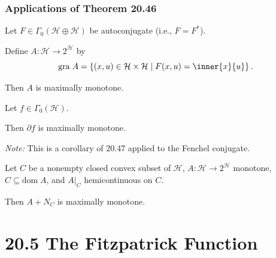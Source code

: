\documentclass[aspectratio=169,10pt]{beamer}
\newcommand{\gra}{\mathrm{gra}\;}
\newcommand{\dom}{\mathrm{dom}\;}
\newcommand{\set}[1]{\left\{#1\right\}}
\newcommand{\Hilbert}{\mathcal{H}}
\begin{document}
\begin{frame}
    \frametitle{Applications of Theorem 20.46}

    \begin{corollary}
        Let $F \in \Gamma_0(\Hilbert \oplus \Hilbert)$ be autoconjugate (i.e., $F = F^*$).

        Define $A : \Hilbert \to 2^{\Hilbert}$ by
        \[
            \gra A = \set{(x, u) \in \Hilbert \times \Hilbert \mid F(x, u) = \inner{x}{u}}.
        \]

        Then $A$ is maximally monotone.
    \end{corollary}

    \vspace{1em}

    \begin{theorem}
        Let $f \in \Gamma_0(\Hilbert)$.

        Then $\partial f$ is maximally monotone.

        \textit{Note:} This is a corollary of 20.47 applied to the Fenchel conjugate.
    \end{theorem}

    \vspace{1em}

    \begin{theorem}
        Let $C$ be a nonempty closed convex subset of $\Hilbert$, $A : \Hilbert \to 2^{\Hilbert}$ monotone,
        $C \subseteq \dom A$, and $A|_C$ hemicontinuous on $C$.

        Then $A + N_C$ is maximally monotone.
    \end{theorem}
\end{frame}

\section{20.5 The Fitzpatrick Function}
\end{document}
